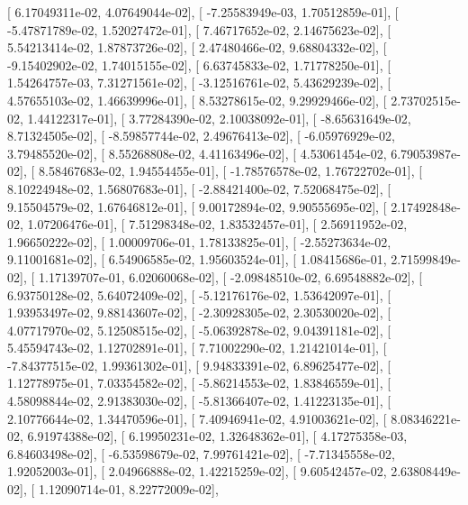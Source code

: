 \documentclass{article}
\begin{document}
       [  6.17049311e-02,   4.07649044e-02],
       [ -7.25583949e-03,   1.70512859e-01],
       [ -5.47871789e-02,   1.52027472e-01],
       [  7.46717652e-02,   2.14675623e-02],
       [  5.54213414e-02,   1.87873726e-02],
       [  2.47480466e-02,   9.68804332e-02],
       [ -9.15402902e-02,   1.74015155e-02],
       [  6.63745833e-02,   1.71778250e-01],
       [  1.54264757e-03,   7.31271561e-02],
       [ -3.12516761e-02,   5.43629239e-02],
       [  4.57655103e-02,   1.46639996e-01],
       [  8.53278615e-02,   9.29929466e-02],
       [  2.73702515e-02,   1.44122317e-01],
       [  3.77284390e-02,   2.10038092e-01],
       [ -8.65631649e-02,   8.71324505e-02],
       [ -8.59857744e-02,   2.49676413e-02],
       [ -6.05976929e-02,   3.79485520e-02],
       [  8.55268808e-02,   4.41163496e-02],
       [  4.53061454e-02,   6.79053987e-02],
       [  8.58467683e-02,   1.94554455e-01],
       [ -1.78576578e-02,   1.76722702e-01],
       [  8.10224948e-02,   1.56807683e-01],
       [ -2.88421400e-02,   7.52068475e-02],
       [  9.15504579e-02,   1.67646812e-01],
       [  9.00172894e-02,   9.90555695e-02],
       [  2.17492848e-02,   1.07206476e-01],
       [  7.51298348e-02,   1.83532457e-01],
       [  2.56911952e-02,   1.96650222e-02],
       [  1.00009706e-01,   1.78133825e-01],
       [ -2.55273634e-02,   9.11001681e-02],
       [  6.54906585e-02,   1.95603524e-01],
       [  1.08415686e-01,   2.71599849e-02],
       [  1.17139707e-01,   6.02060068e-02],
       [ -2.09848510e-02,   6.69548882e-02],
       [  6.93750128e-02,   5.64072409e-02],
       [ -5.12176176e-02,   1.53642097e-01],
       [  1.93953497e-02,   9.88143607e-02],
       [ -2.30928305e-02,   2.30530020e-02],
       [  4.07717970e-02,   5.12508515e-02],
       [ -5.06392878e-02,   9.04391181e-02],
       [  5.45594743e-02,   1.12702891e-01],
       [  7.71002290e-02,   1.21421014e-01],
       [ -7.84377515e-02,   1.99361302e-01],
       [  9.94833391e-02,   6.89625477e-02],
       [  1.12778975e-01,   7.03354582e-02],
       [ -5.86214553e-02,   1.83846559e-01],
       [  4.58098844e-02,   2.91383030e-02],
       [ -5.81366407e-02,   1.41223135e-01],
       [  2.10776644e-02,   1.34470596e-01],
       [  7.40946941e-02,   4.91003621e-02],
       [  8.08346221e-02,   6.91974388e-02],
       [  6.19950231e-02,   1.32648362e-01],
       [  4.17275358e-03,   6.84603498e-02],
       [ -6.53598679e-02,   7.99761421e-02],
       [ -7.71345558e-02,   1.92052003e-01],
       [  2.04966888e-02,   1.42215259e-02],
       [  9.60542457e-02,   2.63808449e-02],
       [  1.12090714e-01,   8.22772009e-02],
\end{document}
